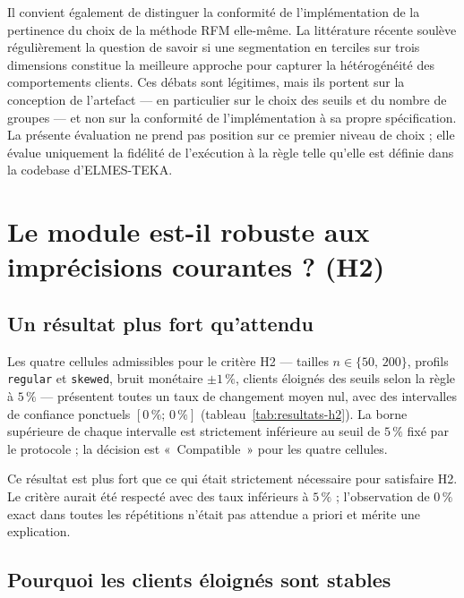 Il convient également de distinguer la conformité de l'implémentation de la pertinence du
choix de la méthode RFM elle-même. La littérature récente \citep{ViannaFilho2026,
Kassambara2026} soulève régulièrement la question de savoir si une segmentation en terciles
sur trois dimensions constitue la meilleure approche pour capturer la hétérogénéité des
comportements clients. Ces débats sont légitimes, mais ils portent sur la conception de
l'artefact — en particulier sur le choix des seuils et du nombre de groupes — et non sur
la conformité de l'implémentation à sa propre spécification. La présente évaluation ne
prend pas position sur ce premier niveau de choix ; elle évalue uniquement la fidélité de
l'exécution à la règle telle qu'elle est définie dans la codebase d'ELMES-TEKA.

\section{Le module est-il robuste aux imprécisions courantes ? (H2)}
\label{sec:disc-h2}

\subsection{Un résultat plus fort qu'attendu}
\label{subsec:disc-h2-force}

Les quatre cellules admissibles pour le critère H2 — tailles $n \in \{50,\, 200\}$,
profils \texttt{regular} et \texttt{skewed}, bruit monétaire $\pm1\,\%$, clients éloignés
des seuils selon la règle à $5\,\%$ — présentent toutes un taux de changement moyen nul,
avec des intervalles de confiance ponctuels $[0\,\% ;\, 0\,\%]$
(tableau~\ref{tab:resultats-h2}). La borne supérieure de chaque intervalle est strictement
inférieure au seuil de $5\,\%$ fixé par le protocole ; la décision est «~Compatible~» pour
les quatre cellules.

Ce résultat est plus fort que ce qui était strictement nécessaire pour satisfaire H2. Le
critère aurait été respecté avec des taux inférieurs à $5\,\%$ ; l'observation de $0\,\%$
exact dans toutes les répétitions n'était pas attendue a priori et mérite une explication.

\subsection{Pourquoi les clients éloignés sont stables}
\label{subsec:disc-h2-pourquoi}


